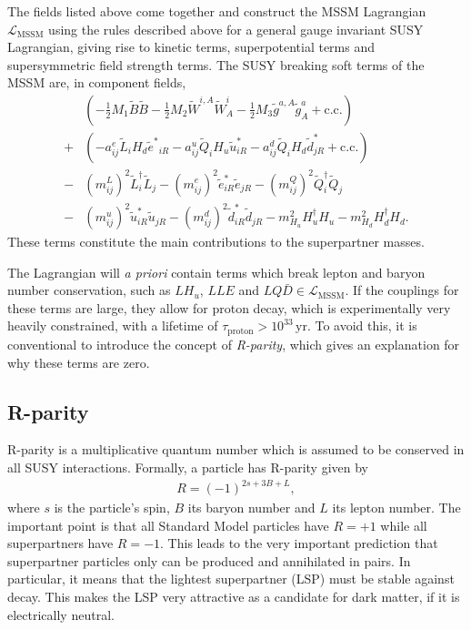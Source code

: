 \documentclass[twoside,english]{uiofysmaster}
\begin{document}
The fields listed above come together and construct the MSSM Lagrangian $\mathcal{L}_\mathrm{MSSM}$ using the rules described above for a general gauge invariant SUSY Lagrangian, giving rise to kinetic terms, superpotential terms and supersymmetric field strength terms. The SUSY breaking soft terms of the MSSM are, in component fields,
\begin{align}
	&\left( -\frac{1}{2}M_1 \tilde B \tilde B - \frac{1}{2}M_2 \tilde W^{i,A} \tilde W^i_A - \frac{1}{2}M_3 \tilde g^{a,A}\tilde g^a_A + \mathrm{c.c.} \right)\nonumber\\
	+ &\left(-a_{ij}^e \tilde L_i H_d {\tilde e^*}_{iR} - a_{ij}^u \tilde Q_i H_u \tilde u^*_{iR} - a_{ij}^d \tilde Q_i H_d \tilde d^*_{jR} + \mathrm{c.c.} \right)\\
	- &(m_{ij}^L)^2 \tilde L_i^\dag \tilde L_j - (m_{ij}^e)^2 {\tilde e_{iR}^*} {\tilde e_{jR}} - (m_{ij}^Q)^2 \tilde Q_i^\dag \tilde Q_j \nonumber \\
	- &(m_{ij}^u)^2 {\tilde u_{iR}^*} {\tilde u_{jR}} - (m_{ij}^d)^2 {\tilde d_{iR}^*} {\tilde d_{jR}} - m^2_{H_u} H^\dag_u H_u - m^2_{H_d} H^\dag_d H_d.\nonumber
\end{align}
These terms constitute the main contributions to the superpartner masses.

The Lagrangian will {\it a priori} contain terms which break lepton and baryon number conservation, such as $LH_u$, $LLE$ and $LQ\bar D \in \mathcal{L}_\mathrm{MSSM}$. If the couplings for these terms are large, they allow for proton decay, which is experimentally very heavily constrained, with a lifetime of $\tau_\mathrm{proton} > 10^{33} \,\mathrm{yr}$. To avoid this, it is conventional to introduce the concept of {\it R-parity}, which gives an explanation for why these terms are zero.

\subsection{R-parity}
R-parity is a multiplicative quantum number which is assumed to be conserved in all SUSY interactions. Formally, a particle has R-parity given by
\begin{align}
	R = (-1)^{2s + 3B + L},
\end{align}
where $s$ is the particle's spin, $B$ its baryon number and $L$ its lepton number. The important point is that all Standard Model particles have $R=+1$ while all superpartners have $R = -1$. This leads to the very important prediction that superpartner particles only can be produced and annihilated in pairs. In particular, it means that the lightest superpartner (LSP) must be stable against decay. This makes the LSP very attractive as a candidate for dark matter, if it is electrically neutral.
\end{document}
